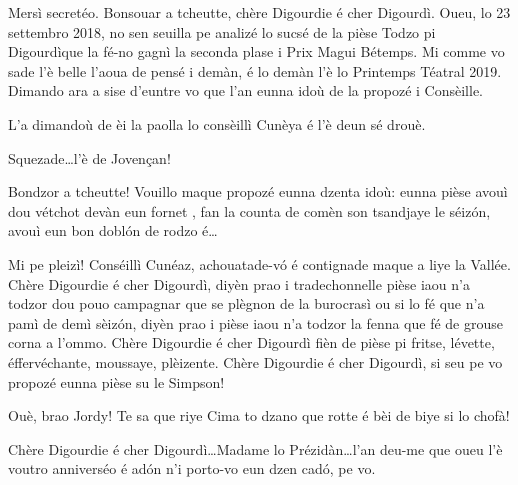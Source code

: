 \begin{drama}
\Presidanspeaks {} Mersì secretéo. Bonsouar a tcheutte, chère Digourdie é cher Digourdì. Oueu, lo 23 settembro 2018, no sen seuilla pe analizé lo sucsé de la pièse \og Todzo pi Digourdì\fg que la fé-no gagnì la seconda plase i Prix Magui Bétemps.
Mi comme vo sade l'è belle l’aoua de pensé i demàn, é lo demàn l’è lo Printemps Téatral 2019. Dimando ara a sise d'euntre vo que l'an eunna idoù de la propozé i Consèille.


\Presidanspeaks L’a dimandoù de èi la paolla lo consèillì Cunèya é l’è deun sé drouè.


\Cimaspeaks {} Squezade\ldots l'è de Jovençan!

\Richardspeaks Bondzor a tcheutte! Vouillo maque propozé eunna dzenta idoù: eunna pièse avouì dou vétchot devàn eun fornet \fornet, fan la counta de comèn son tsandjaye le séiz\'on, avouì eun bon dobl\'on de rodzo é\ldots

\Jordyspeaks {} Mi pe pleizì! Conséillì Cunéaz, achouatade-v\'o é contignade maque a liye la Vallée. Chère Digourdie é cher Digourdì, diyèn prao i tradechonnelle pièse iaou n'a todzor dou pouo campagnar que se plègnon de la burocrasì ou si lo fé que n'a pamì de demì sèiz\'on, diyèn prao i pièse iaou n'a todzor la fenna que fé de grouse corna a l'ommo. Chère Digourdie é cher Digourdì fièn de pièse pi fritse, lévette, éffervéchante, moussaye, plèizente. Chère Digourdie é cher Digourdì, si seu pe vo propozé eunna pièse su le Simpson\homer !

\Marcospeaks Ouè, brao Jordy! Te sa que riye Cima to dzano que rotte é bèi de biye si lo chofà!

\Dallasspeaks Chère Digourdie é cher Digourdì\ldots Madame lo Prézidàn\ldots l'an deu-me que oueu l'è voutro anniverséo é ad\'on n'i porto-vo eun dzen cad\'o, pe vo.


\end{drama}
